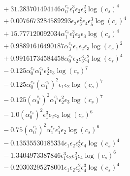 \documentclass[10pt]{article}
\begin{document}
\begin{align*}
&{}  + 31.283701494146 \alpha_{0}^{c_s} \epsilon_{1}^{3} \epsilon_{2} \epsilon_{3}^{2} \log{\left(c_{s} \right)}^{4} \\
&{}  + 0.0076673284589293 \epsilon_{2} \epsilon_{3}^{2} \epsilon_{4} \epsilon_{5}^{3} \log{\left(c_{s} \right)}^{4} \\
&{}  + 15.777120092034 \alpha_{1}^{c_s} \epsilon_{1}^{3} \epsilon_{2} \epsilon_{3} \log{\left(c_{s} \right)}^{4} \\
&{}  + 0.98891616490187 \alpha_{3}^{c_s} \epsilon_{1} \epsilon_{2} \epsilon_{3} \log{\left(c_{s} \right)}^{2} \\
&{}  + 0.99161734584458 \alpha_{0}^{c_s} \epsilon_{2} \epsilon_{3}^{3} \epsilon_{4}^{2} \log{\left(c_{s} \right)}^{4} \\
&{}  - 0.125 \alpha_{0}^{c_s} \alpha_{1}^{c_s} \epsilon_{2}^{3} \epsilon_{3} \log{\left(c_{s} \right)}^{7} \\
&{}  - 0.125 \alpha_{0}^{c_s} \left(\alpha_{1}^{c_s}\right)^{2} \epsilon_{1} \epsilon_{2} \log{\left(c_{s} \right)}^{7} \\
&{}  - 0.125 \left(\alpha_{0}^{c_s}\right)^{2} \alpha_{1}^{c_s} \epsilon_{2}^{2} \epsilon_{3} \log{\left(c_{s} \right)}^{7} \\
&{}  - 1.0 \left(\alpha_{0}^{c_s}\right)^{2} \epsilon_{1}^{3} \epsilon_{2} \epsilon_{3} \log{\left(c_{s} \right)}^{6} \\
&{}  - 0.75 \left(\alpha_{0}^{c_s}\right)^{2} \alpha_{1}^{c_s} \epsilon_{1}^{2} \epsilon_{2} \log{\left(c_{s} \right)}^{6} \\
&{}  - 0.13535530185334 \epsilon_{1} \epsilon_{2} \epsilon_{3}^{4} \epsilon_{4} \log{\left(c_{s} \right)}^{4} \\
&{}  - 1.3404973387846 \epsilon_{1}^{3} \epsilon_{2} \epsilon_{3}^{2} \epsilon_{4} \log{\left(c_{s} \right)}^{6} \\
&{}  - 0.20303295278001 \epsilon_{1} \epsilon_{2} \epsilon_{3}^{2} \epsilon_{4}^{3} \log{\left(c_{s} \right)}^{4}
\end{align*}
\end{document}
